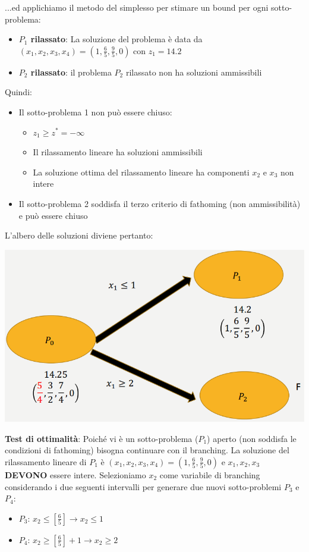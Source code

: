 \documentclass[12pt]{article}
\begin{document}
...ed applichiamo il metodo del simplesso per stimare un bound per ogni sotto-problema:
\begin{itemize}
    \item \textbf{$P_1$ rilassato}: La soluzione del problema è data da $(x_1,x_2,x_3,x_4) = (1, \frac{6}{5}, \frac{9}{5}, 0)$ con $z_1 = 14.2$
    \item \textbf{$P_2$ rilassato}: il problema $P_2$ rilassato non ha soluzioni ammissibili
\end{itemize}
Quindi:
\begin{itemize}
    \item Il sotto-problema 1 non può essere chiuso:
    \begin{itemize}
        \item $z_1 \geq z^* = -\infty$
        \item Il rilassamento lineare ha soluzioni ammissibili
        \item La soluzione ottima del rilassamento lineare ha componenti $x_2$ e $x_3$ non intere
    \end{itemize}
    \item Il sotto-problema 2 soddisfa il terzo criterio di fathoming (non ammissibilità) e può essere chiuso
\end{itemize}
L'albero delle soluzioni diviene pertanto:
\begin{center}
    \includegraphics[width = 0.70\linewidth]{Images/76.png}
\end{center}
\textbf{Test di ottimalità}: Poiché vi è un sotto-problema ($P_1$) aperto (non soddisfa le condizioni di fathoming) bisogna continuare con il branching.
La soluzione del rilassamento lineare di $P_1$ è $(x_1,x_2,x_3,x_4) = (1, \frac{6}{5}, \frac{9}{5}, 0)$ e $x_1,x_2,x_3$ \textbf{DEVONO} essere intere.
Selezioniamo $x_2$ come variabile di branching considerando i due seguenti intervalli per generare due nuovi sotto-problemi $P_3$ e $P_4$:
\begin{itemize}
    \item $P_3$: $x_2 \leq \left [\frac{6}{5} \right ] \rightarrow x_2 \leq 1$
    \item $P_4$: $x_2 \geq \left [{\frac{6}{5}} \right ] + 1 \rightarrow x_2 \geq 2$
\end{itemize}
\end{document}
